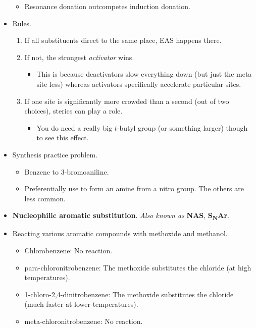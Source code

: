 \documentclass[../notes.tex]{subfiles}
\begin{document}
\begin{itemize}
\begin{itemize}
        \item Resonance donation outcompetes induction donation.
    \end{itemize}
    \item Rules.
    \begin{enumerate}
        \item If all substituents direct to the same place, EAS happens there.
        \item If not, the strongest \emph{activator} wins.
        \begin{itemize}
            \item This is because deactivators slow everything down (but just the meta site less) whereas activators specifically accelerate particular sites.
        \end{itemize}
        \item If one site is significantly more crowded than a second (out of two choices), sterics can play a role.
        \begin{itemize}
            \item You do need a really big $t$-butyl group (or something larger) though to see this effect.
        \end{itemize}
    \end{enumerate}
    \item Synthesis practice problem.
    \begin{itemize}
        \item Benzene to 3-bromoaniline.
        \item Preferentially use  to form an amine from a nitro group. The others are less common.
    \end{itemize}
    \item \textbf{Nucleophilic aromatic substitution}. \emph{Also known as} \textbf{NAS}, \textbf{S\textsubscript{N}Ar}.
    \item Reacting various aromatic compounds with methoxide and methanol.
    \begin{itemize}
        \item Chlorobenzene: No reaction.
        \item para-chloronitrobenzene: The methoxide substitutes the chloride (at high temperatures).
        \item 1-chloro-2,4-dinitrobenzene: The methoxide substitutes the chloride (much faster at lower temperatures).
        \item meta-chloronitrobenzene: No reaction.
    \end{itemize}

\end{itemize}
\end{document}
